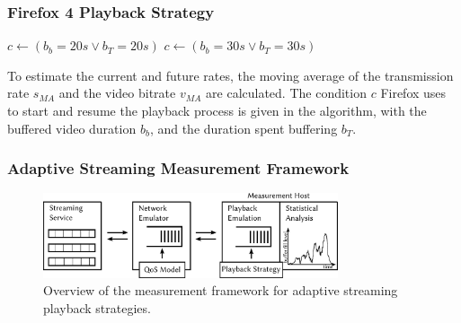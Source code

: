 \documentclass{beamer}
\begin{document}
\begin{frame}
	\frametitle{Firefox 4 Playback Strategy}

		\begin{algorithmic}
				\STATE $c \gets ( b_b=20s \lor b_T=20s )$
			\ELSE
				\STATE $c \gets ( b_b=30s \lor b_T=30s )$
			\ENDIF
		\end{algorithmic}

	To estimate the current and future rates, the moving average of the transmission rate $s_{MA}$ and the video bitrate $v_{MA}$ are calculated. The condition $c$ Firefox uses to start and resume the playback process is given in the algorithm, with the buffered video duration $b_b$, and the duration spent buffering $b_T$.
\end{frame}

\begin{frame}
	\frametitle{Adaptive Streaming Measurement Framework}

	\begin{figure}
		\centering
		\includegraphics[height=2.5cm]{../../chapters/03-streaming/images/feedback-measurement-model.pdf}
		\caption{Overview of the measurement framework for adaptive streaming playback strategies.}
	\end{figure}
\end{frame}
\end{document}
